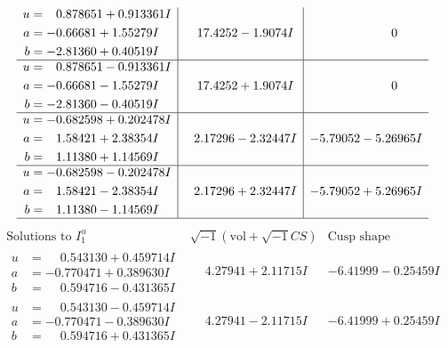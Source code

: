 \documentclass[1p]{elsarticle_modified}
\theoremstyle{definition}
\newcommand{\I}{\sqrt{-1}}
\begin{document}
$$\begin{array}{c|c|c}
\begin{aligned}
u &= \phantom{-}0.878651 + 0.913361 I \\
a &= -0.66681 + 1.55279 I \\
b &= -2.81360 + 0.40519 I\end{aligned}
 & \phantom{-}17.4252 - 1.9074 I & \phantom{-0.000000 } 0 \\ \hline\begin{aligned}
u &= \phantom{-}0.878651 - 0.913361 I \\
a &= -0.66681 - 1.55279 I \\
b &= -2.81360 - 0.40519 I\end{aligned}
 & \phantom{-}17.4252 + 1.9074 I & \phantom{-0.000000 } 0 \\ \hline\begin{aligned}
u &= -0.682598 + 0.202478 I \\
a &= \phantom{-}1.58421 + 2.38354 I \\
b &= \phantom{-}1.11380 + 1.14569 I\end{aligned}
 & \phantom{-}2.17296 - 2.32447 I & -5.79052 - 5.26965 I \\ \hline\begin{aligned}
u &= -0.682598 - 0.202478 I \\
a &= \phantom{-}1.58421 - 2.38354 I \\
b &= \phantom{-}1.11380 - 1.14569 I\end{aligned}
 & \phantom{-}2.17296 + 2.32447 I & -5.79052 + 5.26965 I\\
 \hline 
 \end{array}$$\newpage$$\begin{array}{c|c|c}  
\text{Solutions to }I^u_{1}& \I (\text{vol} + \sqrt{-1}CS) & \text{Cusp shape}\\
 \hline 
\begin{aligned}
u &= \phantom{-}0.543130 + 0.459714 I \\
a &= -0.770471 + 0.389630 I \\
b &= \phantom{-}0.594716 - 0.431365 I\end{aligned}
 & \phantom{-}4.27941 + 2.11715 I & -6.41999 - 0.25459 I \\ \hline\begin{aligned}
u &= \phantom{-}0.543130 - 0.459714 I \\
a &= -0.770471 - 0.389630 I \\
b &= \phantom{-}0.594716 + 0.431365 I\end{aligned}
 & \phantom{-}4.27941 - 2.11715 I & -6.41999 + 0.25459 I \\ \hline\begin{aligned}

\end{aligned}
\end{array}$$
\end{document}

